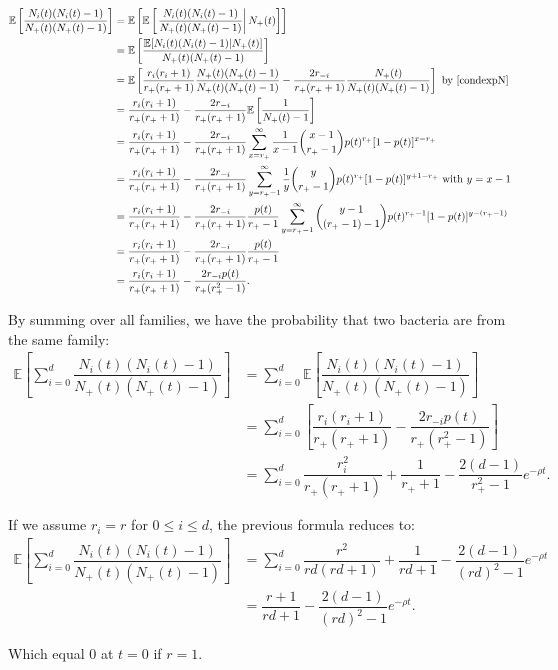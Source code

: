 \documentclass{article}
\begin{document}
\begin{align}
\mathbb{E}\left[ \dfrac{N_i(t)(N_i(t)-1)}{N_+(t) ( N_+(t)-1 )} \right] &= 
 \mathbb{E}\left[ \mathbb{E}\left[ \left. \dfrac{N_i(t)(N_i(t)-1)}{N_+(t)( N_+(t)-1 ) } \right\vert N_+(t) \right] \right]\\
 &= \mathbb{E}\left[  \dfrac{\mathbb{E}[ N_i(t)(N_i(t)-1) \vert N_+(t) ] }{N_+(t) (N_+(t)-1 ) }  \right]\\
 &=\mathbb{E}\left[\dfrac{r_i(r_i+1)}{r_+ (r_+ +1)} \dfrac{N_+(t)( N_+(t)-1 )}{N_+(t)( N_+(t)-1) }- \dfrac{2r_{-i}}{r_+ (r_+ +1)} \dfrac{N_+(t)}{N_+(t)( N_+(t)-1 ) } \right] \text{ by \eqref{condexpN}}\\
 &=\dfrac{r_i(r_i+1)}{r_+ (r_+ +1 )}-\dfrac{2r_{-i}}{r_+ (r_+ +1 )}\mathbb{E}\left[\dfrac{1}{N_+(t)-1} \right]\\
 &=\dfrac{r_i(r_i+1)}{r_+ (r_+ +1 )}-\dfrac{2r_{-i}}{r_+ (r_+ +1 )} \sum_{x=r_+}^{\infty } \dfrac{1}{x-1} \binom{x-1}{r_+-1} p(t)^{r_+} [1-p(t)]^{x-r_+} \\
 &=\dfrac{r_i(r_i+1)}{r_+ (r_+ +1 )}-\dfrac{2r_{-i}}{r_+ (r_+ +1 )}\sum_{y=r_+-1}^{\infty} \dfrac{1}{y} \binom{y}{r_+-1} p(t)^{r_+} [1-p(t)]^{y+1-r_+} \text{ with }y=x-1\\
 &=\dfrac{r_i(r_i+1)}{r_+ (r_+ +1 )}-\dfrac{2r_{-i}}{r_+ (r_+ +1 )}\dfrac{p(t)}{r_+-1}\sum_{y=r_+-1}^{\infty}\binom{y-1}{(r_+-1)-1} p(t)^{r_+-1} [1-p(t)]^{y-(r_+-1)} \\
 &=\dfrac{r_i(r_i+1)}{r_+ (r_+ +1 )}-\dfrac{2r_{-i}}{r_+ (r_+ +1 )}\dfrac{p(t)}{r_+-1}\\
 &=\dfrac{r_i(r_i+1)}{r_+ (r_+ +1 )}-\dfrac{2r_{-i}p(t)}{r_+ (r_+^2 -1 )}.
\end{align}

By summing over all families, we have the probability that two bacteria are from the same family:
\begin{align}
\mathbb{E}\left[ \displaystyle \sum_{i=0}^d \dfrac{N_i(t)(N_i(t)-1)}{N_+(t)(N_+(t)-1)} \right] &= \displaystyle \sum_{i=0}^d \mathbb{E}\left[  \dfrac{N_i(t)(N_i(t)-1)}{N_+(t)( N_+(t)-1 ) } \right]\\
&= \displaystyle \sum_{i=0}^d \left[ \dfrac{r_i(r_i+1)}{r_+ (r_+ +1 )}-\dfrac{2r_{-i}p(t)}{r_+ (r_+^2 -1 )} \right] \\
&= \displaystyle  \sum_{i=0}^d \dfrac{r_i^2}{r_+ (r_+ +1)} +\dfrac{1}{ r_+ +1} -\dfrac{2(d-1)}{r_+^2 -1 }e^{-\rho t}.
\end{align}

If we assume $r_i=r$ for $0 \leq i \leq d$, the previous formula reduces to:
\begin{align}
\mathbb{E}\left[ \displaystyle \sum_{i=0}^d \dfrac{N_i(t)(N_i(t)-1)}{N_+(t)\left(N_+(t)-1 \right)} \right] &=
 \sum_{i=0}^d \dfrac{r^2}{rd(rd+1)} +\dfrac{1}{ rd +1} -\dfrac{2(d-1)}{(rd)^2 -1 }e^{-\rho t}\\
 &= \dfrac{r+1}{rd+1}  -\dfrac{2(d-1)}{(rd)^2 -1 }e^{-\rho t}.
\end{align}

Which equal $0$ at $t=0$ if $r=1$.
\end{document}

